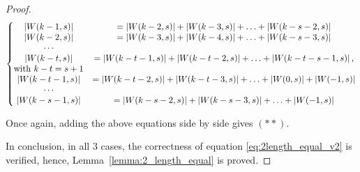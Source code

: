 \begin{proof}
    \[\left\{\begin{matrix}
        \left \lvert  W(k-1,s) \right \rvert &= \left \lvert  W(k-2,s) \right \rvert + \left \lvert  W(k-3,s) \right \rvert+\ldots + \left \lvert  W(k-s-2,s) \right \rvert \\
        \left \lvert  W(k-2,s) \right \rvert &= \left \lvert  W(k-3,s) \right \rvert + \left \lvert  W(k-4,s) \right \rvert+\ldots + \left \lvert  W(k-s-3,s) \right \rvert \\
        \cdots \\
        \left \lvert  W(k-t,s) \right \rvert &= \left \lvert  W(k-t-1,s) \right \rvert + \left \lvert  W(k-t-2,s) \right \rvert+\ldots + \left \lvert  W(k-t-s-1,s) \right \rvert,\\ \text{with } k-t=s+1  \\
        \left \lvert  W(k-t-1,s) \right \rvert &= \left \lvert  W(k-t-2,s) \right \rvert + \left \lvert  W(k-t-3,s) \right \rvert+\ldots + \left \lvert  W(0,s) \right \rvert +\left \lvert  W(-1,s) \right \rvert\\
        \cdots\\
        \left \lvert  W(k-s-1,s) \right \rvert &= \left \lvert  W(k-s-2,s) \right \rvert + \left \lvert  W(k-s-3,s) \right \rvert +\ldots+ \left \lvert  W(-1,s) \right \rvert \\
    \end{matrix}\right.\]

    Once again, adding the above equations side by side gives $(**)$.
    
    In conclusion, in all $3$ cases, the correctness of equation \ref{eq:2length_equal_v2} is verified, hence, Lemma~\ref{lemma:2_length_equal} is proved.
\end{proof}

